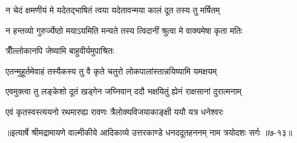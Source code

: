\twolineshloka
{न चेदं क्षमणीयं मे यदेतद्भाषितं त्वया}
{यदेतावन्मया कालं दूत तस्य तु मर्षितम्} %

\twolineshloka
{न हन्तव्यो गुरुर्ज्येष्ठो मयाऽयमिति मन्यते}
{तस्य त्विदानीं श्रुत्वा मे वाक्यमेषा कृता मतिः} %

\onelineshloka
{त्रीँल्लोकानपि जेष्यामि बाहुवीर्यमुपाश्रितः} %

\twolineshloka
{एतन्मुहूर्तमेवाहं तस्यैकस्य तु वै कृते}
{चतुरो लोकपालांस्तान्नयिष्यामि यमक्षयम्} %

\twolineshloka
{एवमुक्त्वा तु लङ्केशो दूतं खड्गेन जघ्निवान्}
{ददौ भक्षयितुं ह्येनं राक्षसानां दुरात्मनाम्} %

\twolineshloka
{एवं कृतस्वस्त्ययनो रथमारुह्य रावणः}
{त्रैलोक्यविजयाकाङ्क्षी ययौ यत्र धनेश्वरः} %


॥इत्यार्षे श्रीमद्रामायणे वाल्मीकीये आदिकाव्ये उत्तरकाण्डे धनददूतहननम् नाम त्रयोदशः सर्गः ॥७-१३॥
